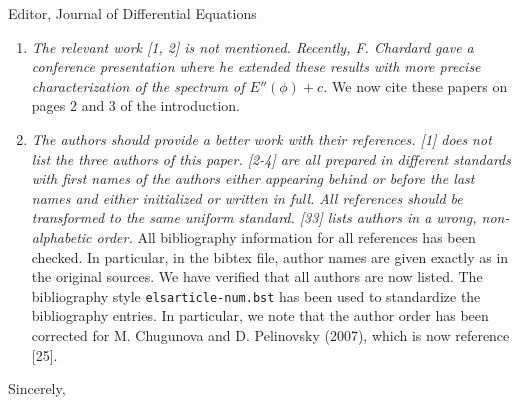 \documentclass[11pt]{letter}
\begin{document}
\begin{letter}{Editor, Journal of Differential Equations}
\begin{enumerate}
    \item \emph{The relevant work [1, 2] is not mentioned. Recently, F. Chardard gave a conference presentation where he extended these results with more precise characterization of the spectrum of $E''(\phi) + c$.} We now cite these papers on pages 2 and 3 of the introduction.
    \vspace{4mm}

    \item \emph{The authors should provide a better work with their references. [1] does not list the three authors of this paper. [2-4] are all prepared in different standards with first names of the authors either appearing behind or before the last names and either initialized or written in full. All references should be transformed to the same uniform standard. [33] lists authors in a wrong, non-alphabetic order.} All bibliography information for all references has been checked. In particular, in the bibtex file, author names are given exactly as in the original sources. We have verified that all authors are now listed. The bibliography style \texttt{elsarticle-num.bst} has been used to standardize the bibliography entries. In particular, we note that the author order has been corrected for M. Chugunova and D. Pelinovsky (2007), which is now reference [25].
\end{enumerate}



\closing{Sincerely,}

\end{letter}
\end{document}
